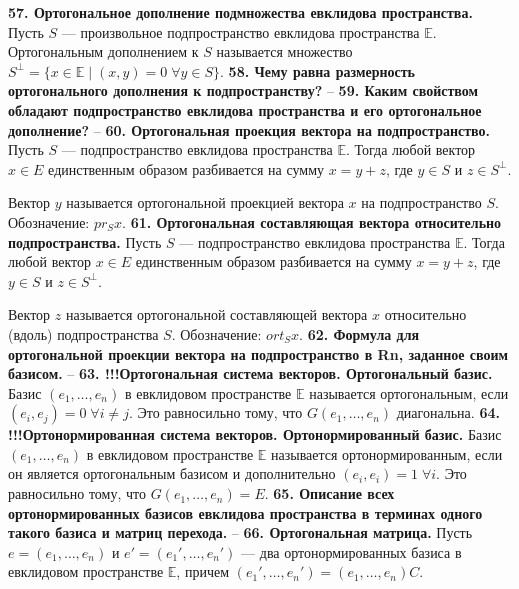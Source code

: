\documentclass{article}
\begin{document}
\textbf{57. Ортогональное дополнение подмножества евклидова пространства.}
Пусть $S$ --- произвольное подпространство евклидова пространства $\mathbb{E}$. Ортогональным дополнением к $S$ называется множество $S^{\perp} = \{x\in \mathbb{E}\; |\; (x,y) = 0\;\forall y \in S\}$.
\newline
\newline
\textbf{58. Чему равна размерность ортогонального дополнения к подпространству?}
--
\newline
\newline
\textbf{59. Каким свойством обладают подпространство евклидова пространства и его ортогональное дополнение?}
--
\newline
\newline
\textbf{60. Ортогональная проекция вектора на подпространство.}
Пусть $S$ --- подпространство евклидова пространства $\mathbb{E}$. Тогда любой вектор $x \in E$ единственным образом разбивается на сумму $x = y + z$, где $y \in S$ и $z \in S^\perp$. 

Вектор $y$ называется ортогональной проекцией вектора $x$ на подпространство $S$. Обозначение: $pr_S x$. 
\newline
\newline
\textbf{61. Ортогональная составляющая вектора относительно подпространства.}
Пусть $S$ --- подпространство евклидова пространства $\mathbb{E}$. Тогда любой вектор $x \in E$ единственным образом разбивается на сумму $x = y + z$, где $y \in S$ и $z \in S^\perp$. 

Вектор $z$ называется ортогональной составляющей вектора $x$ относительно (вдоль) подпространства $S$. Обозначение: $ort_S x$.
\newline
\newline
\textbf{62. Формула для ортогональной проекции вектора на подпространство в Rn, заданное своим базисом.}
--
\newline
\newline
\textbf{63. !!!Ортогональная система векторов. Ортогональный базис.}
Базис $(e_1, \ldots, e_n)$ в евклидовом пространстве $\mathbb{E}$ называется ортогональным, если \\$(e_i, e_j)= 0\; \forall i\neq j$. Это равносильно тому, что $G(e_1, \ldots, e_n)$ диагональна.
\newline
\newline
\textbf{64. !!!Ортонормированная система векторов. Ортонормированный базис.}
Базис $(e_1, \ldots, e_n)$ в евклидовом пространстве $\mathbb{E}$ называется ортонормированным, если он является ортогональным базисом и дополнительно $(e_i, e_i) = 1\; \forall i$. Это равносильно тому, что $G(e_1, \ldots, e_n) = E$.
\newline
\newline
\textbf{65. Описание всех ортонормированных базисов евклидова пространства в терминах одного такого базиса и матриц перехода.}
--
\newline
\newline
\textbf{66. Ортогональная матрица.}
Пусть $e = (e_1, \ldots, e_n)$ и $e' = (e_1', \ldots, e_n')$ --- два ортонормированных базиса в евклидовом пространстве $\mathbb{E}$, причем $(e_1', \ldots, e_n') = (e_1, \ldots, e_n)C$. 
\end{document}
